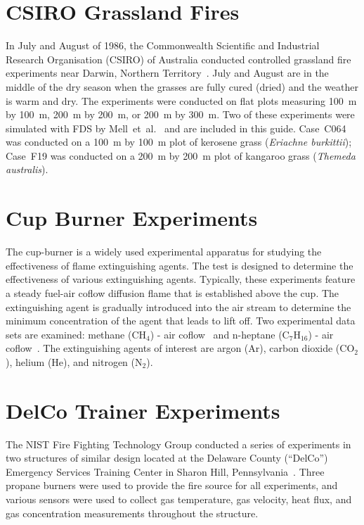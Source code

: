 \section{CSIRO Grassland Fires}

In July and August of 1986, the Commonwealth Scientific and Industrial Research Organisation (CSIRO) of Australia conducted controlled grassland fire experiments near Darwin, Northern Territory~\cite{Cheney:IJWF1993}. July and August are in the middle of the dry season when the grasses are fully cured (dried) and the weather is warm and dry. The experiments were conducted on flat plots measuring 100~m by 100~m, 200~m by 200~m, or 200~m by 300~m. Two of these experiments were simulated with FDS by Mell~et~al.~\cite{Mell:IJWF2007} and are included in this guide. Case~C064 was conducted on a 100~m by 100~m plot of kerosene grass ({\it Eriachne burkittii}); Case~F19 was conducted on a 200~m by 200~m plot of kangaroo grass ({\it Themeda australis}).


\section{Cup Burner Experiments}

The cup-burner is a widely used experimental apparatus for studying the effectiveness of flame extinguishing agents. The test is designed to determine the effectiveness of various extinguishing agents. Typically, these experiments feature a steady fuel-air coflow diffusion flame that is established above the cup. The extinguishing agent is gradually introduced into the air stream to determine the minimum concentration of the agent that leads to lift off. Two experimental data sets are examined: methane (CH$_4$) - air coflow~\cite{Takahashi:2007} and n-heptane (C$_7$H$_{16}$) - air coflow~\cite{Moore:1996}. The extinguishing agents of interest are argon (Ar), carbon dioxide (CO$_2$), helium (He), and nitrogen (N$_2$).

\section{DelCo Trainer Experiments}
\label{DelCo_Description}

The NIST Fire Fighting Technology Group conducted a series of experiments in two structures of similar design located at the Delaware County (``DelCo'') Emergency Services Training Center in Sharon Hill, Pennsylvania~\cite{DelCo_TN}. Three propane burners were used to provide the fire source for all experiments, and various sensors were used to collect gas temperature, gas velocity, heat flux, and gas concentration measurements throughout the structure.

